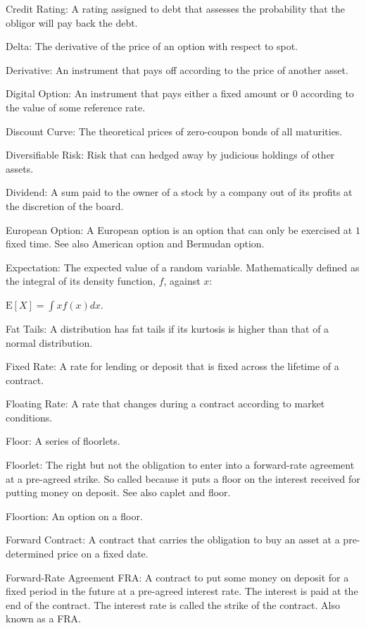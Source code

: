 Credit Rating: A rating assigned to debt that assesses the probability that the obligor will pay back the debt.

Delta: The derivative of the price of an option with respect to spot.

Derivative: An instrument that pays off according to the price of another asset.

Digital Option: An instrument that pays either a fixed amount or $0$ according to the value of some reference rate.

Discount Curve: The theoretical prices of zero-coupon bonds of all maturities.

Diversifiable Risk: Risk that can hedged away by judicious holdings of other assets.

Dividend: A sum paid to the owner of a stock by a company out of its profits at the discretion of the board.

European Option: A European option is an option that can only be exercised at $1$ fixed time. See also American option and Bermudan option.

Expectation: The expected value of a random variable. Mathematically defined as the integral of its density function, $f$, against $x$:

$\text{E} [X] = \int x f(x) dx$.

Fat Tails: A distribution has fat tails if its kurtosis is higher than that of a normal distribution.

Fixed Rate: A rate for lending or deposit that is fixed across the lifetime of a contract.

Floating Rate: A rate that changes during a contract according to market conditions.

Floor: A series of floorlets.

Floorlet: The right but not the obligation to enter into a forward-rate agreement at a pre-agreed strike. So called because it puts a floor on the interest received for putting money on deposit. See also caplet and floor.

Floortion: An option on a floor.

Forward Contract: A contract that carries the obligation to buy an asset at a pre-determined price on a fixed date.

Forward-Rate Agreement FRA: A contract to put some money on deposit for a fixed period in the future at a pre-agreed interest rate. The interest is paid at the end of the contract. The interest rate is called the strike of the contract. Also known as a FRA.

